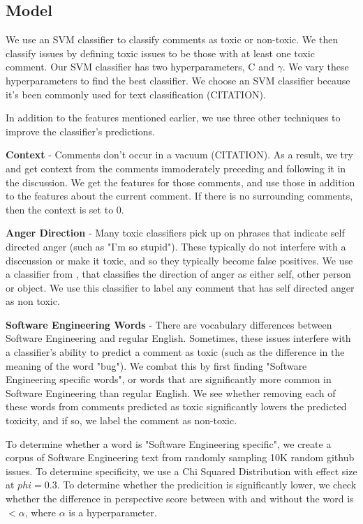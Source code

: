 \documentclass[conference]{IEEEtran}
\begin{document}
\subsection{Model} 

We use an SVM classifier to classify comments as toxic or non-toxic. We then classify issues by defining toxic issues to be those with at least one toxic comment. Our SVM classifier has two hyperparameters, C and $\gamma$. We vary these hyperparameters to find the best classifier. We choose an SVM classifier because it's been commonly used for text classification (CITATION). 

In addition to the features mentioned earlier, we use three other techniques to improve the classifier's predictions. 

\textbf{Context} - Comments don't occur in a vacuum (CITATION). As a result, we try and get context from the comments immoderately preceding and following it in the discussion. We get the features for those comments, and use those in addition to the features about the current comment. If there is no surrounding comments, then the context is set to 0. 

\textbf{Anger Direction} - Many toxic classifiers pick up on phrases that indicate self directed anger (such as "I'm so stupid"). These typically do not interfere with a disccussion or make it toxic, and so they typically become false positives. We use a classifier from \cite{b3}, that classifies the direction of anger as either self, other person or object. We use this classifier to label any comment that has self directed anger as non toxic. 

\textbf{Software Engineering Words} - There are vocabulary differences between Software Engineering and regular English. Sometimes, these issues interfere with a classifier's ability to predict a comment as toxic (such as the difference in the meaning of the word "bug"). We combat this by first finding "Software Engineering specific words", or words that are significantly more common in Software Engineering than regular English. We see whether removing each of these words from comments predicted as toxic significantly lowers the predicted toxicity, and if so, we label the comment as non-toxic. 

To determine whether a word is "Software Engineering specific", we create a corpus of Software Engineering text from randomly sampling 10K random github issues. To determine specificity, we use a Chi Squared Distribution with effect size at $phi=0.3$. \cite{b1}\cite{b4} \cite{b5} To determine whether the predicition is significantly lower, we check whether the difference in perspective score between with and without the word is $<\alpha$, where $\alpha$ is a hyperparameter. 
\end{document}
